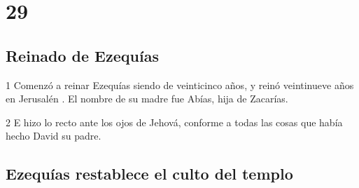 \chapter{29}

\section*{Reinado de Ezequías}

\par 1 Comenzó a reinar Ezequías siendo de veinticinco años, y reinó veintinueve años en Jerusalén . El nombre de su madre fue Abías, hija de Zacarías.
\par 2 E hizo lo recto ante los ojos de Jehová, conforme a todas las cosas que había hecho David su padre.

\section*{Ezequías restablece el culto del templo}

